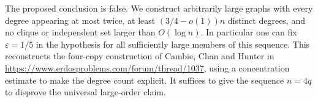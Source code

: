 The proposed conclusion is false. We construct arbitrarily large graphs with every degree appearing at most twice, at least $(3/4-o(1))n$ distinct degrees, and no clique or independent set larger than $O(\log n)$. In particular one can fix $\varepsilon=1/5$ in the hypothesis for all sufficiently large members of this sequence. This reconstructs the four-copy construction of Cambie, Chan and Hunter in \url{https://www.erdosproblems.com/forum/thread/1037}, using a concentration estimate to make the degree count explicit. It suffices to give the sequence $n=4q$ to disprove the universal large-order claim.
